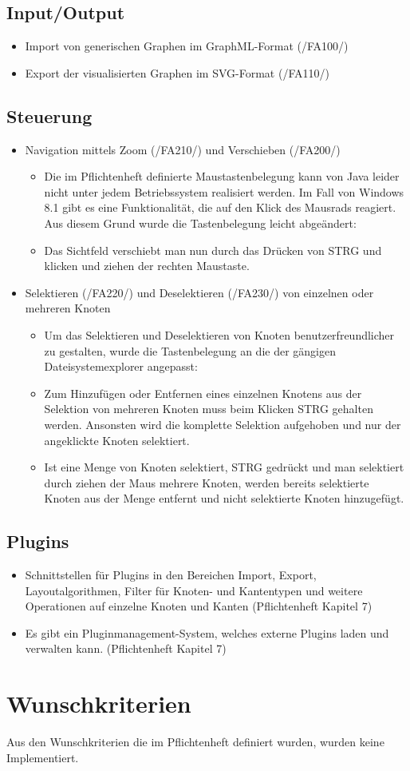 \subsection{Input/Output}
\begin{itemize}
	\item Import von generischen Graphen im GraphML-Format (/FA100/)
	\item Export der visualisierten Graphen im SVG-Format (/FA110/)
\end{itemize}

\subsection{Steuerung}
\label{implkrit:steuerung}
\begin{itemize}
	\item Navigation mittels Zoom (/FA210/) und Verschieben (/FA200/)
	\begin{itemize}
		\item Die im Pflichtenheft definierte Maustastenbelegung kann von Java leider nicht unter jedem Betriebssystem realisiert werden. Im Fall von Windows 8.1 gibt es eine Funktionalität, die auf den Klick des Mausrads reagiert. Aus diesem Grund wurde die Tastenbelegung leicht abgeändert:
		\item Das Sichtfeld verschiebt man nun durch das Drücken von STRG und klicken und ziehen der rechten Maustaste.
	\end{itemize}
	\item Selektieren (/FA220/) und Deselektieren (/FA230/) von einzelnen oder mehreren Knoten
	\begin{itemize}
		\item Um das Selektieren und Deselektieren von Knoten benutzerfreundlicher zu gestalten, wurde die Tastenbelegung an die der gängigen Dateisystemexplorer angepasst:
		\item Zum Hinzufügen oder Entfernen eines einzelnen Knotens aus der Selektion von mehreren Knoten muss beim Klicken STRG gehalten werden. Ansonsten wird die komplette Selektion aufgehoben und nur der angeklickte Knoten selektiert.
		\item Ist eine Menge von Knoten selektiert, STRG gedrückt und man selektiert durch ziehen der Maus mehrere Knoten, werden bereits selektierte Knoten aus der Menge entfernt und nicht selektierte Knoten hinzugefügt.
	\end{itemize}
\end{itemize}

\subsection{Plugins}
\begin{itemize}
	\item Schnittstellen für Plugins in den Bereichen Import, Export, Layoutalgorithmen, Filter für Knoten- und Kantentypen und weitere Operationen auf einzelne Knoten und Kanten (Pflichtenheft Kapitel 7)
	\item Es gibt ein Pluginmanagement-System, welches externe Plugins laden und verwalten kann. (Pflichtenheft Kapitel 7)
\end{itemize}

\section{Wunschkriterien}
Aus den Wunschkriterien die im Pflichtenheft definiert wurden, wurden keine Implementiert.